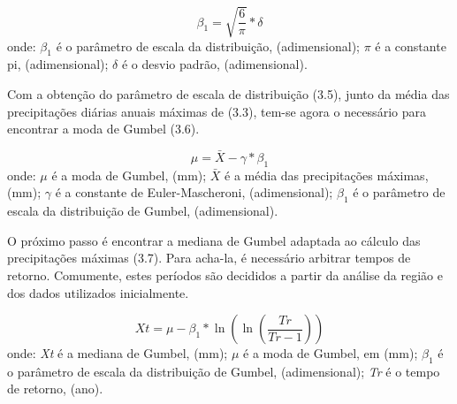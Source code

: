 \begin{equation}
\beta_{1} = \sqrt{\frac{6}{\pi}} * \delta
\end{equation}
\newline
onde:
\newline
$\beta_{1}$ é o parâmetro de escala da distribuição, (adimensional);
\newline
$\pi$ é a constante pi, (adimensional);
\newline
$\delta$ é o desvio padrão, (adimensional).\bigskip

Com a obtenção do parâmetro de escala de distribuição (3.5), junto da média das precipitações diárias anuais máximas de (3.3), tem-se agora o necessário para encontrar a moda de Gumbel (3.6).\bigskip

\begin{equation}
\mu = \bar{X} - \gamma * \beta_{1}
\end{equation}
\newline
\newline
onde:
\newline
$\mu$ é a moda de Gumbel, (mm);
\newline
$\bar{X}$ é a média das precipitações máximas, (mm);
\newline
$\gamma$ é a constante de Euler-Mascheroni, (adimensional);
\newline
$\beta_{1}$ é o parâmetro de escala da distribuição de Gumbel, (adimensional).\bigskip

O próximo passo é encontrar a mediana de Gumbel adaptada ao cálculo das precipitações máximas (3.7). Para acha-la, é necessário arbitrar tempos de retorno. Comumente, estes períodos são decididos a partir da análise da região e dos dados utilizados inicialmente.\bigskip

\begin{equation}
Xt = \mu - \beta_{1} * \ln{\left(\ln{\left(\frac{Tr}{Tr - 1}\right)}\right)}
\end{equation}
\newline
onde:
\newline
\textit{Xt} é a mediana de Gumbel, (mm);
\newline
$\mu$ é a moda de Gumbel, em (mm);
\newline
$\beta_{1}$ é o parâmetro de escala da distribuição de Gumbel, (adimensional);
\newline
\textit{Tr} é o tempo de retorno, (ano).\bigskip

